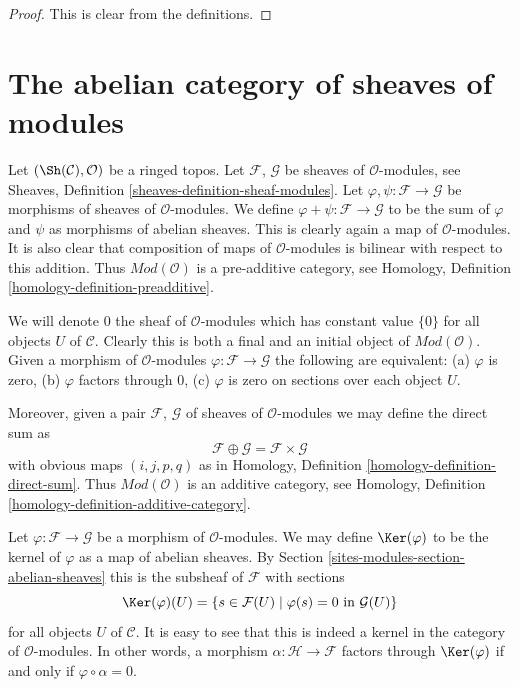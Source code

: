 \begin{proof}
This is clear from the definitions.
\end{proof}

\section{The abelian category of sheaves of modules}
\label{sites-modules-section-kernels}
Let $(\Sh(\mathcal{C}), \mathcal{O})$ be a ringed topos.
Let $\mathcal{F}$, $\mathcal{G}$ be sheaves of $\mathcal{O}$-modules, see
Sheaves, Definition \ref{sheaves-definition-sheaf-modules}.
Let $\varphi, \psi : \mathcal{F} \to \mathcal{G}$
be morphisms of sheaves of $\mathcal{O}$-modules.
We define $\varphi + \psi : \mathcal{F} \to \mathcal{G}$
to be the sum of $\varphi$ and $\psi$ as morphisms of abelian sheaves.
This is clearly again a map of $\mathcal{O}$-modules.
It is also clear that composition of maps of
$\mathcal{O}$-modules is bilinear with respect to this
addition. Thus $\textit{Mod}(\mathcal{O})$ is a pre-additive
category, see Homology, Definition \ref{homology-definition-preadditive}.

\medskip\noindent
We will denote $0$ the sheaf of $\mathcal{O}$-modules
which has constant value $\{0\}$ for all objects $U$ of $\mathcal{C}$.
Clearly this is both a final and an initial object of
$\textit{Mod}(\mathcal{O})$. Given a morphism
of $\mathcal{O}$-modules $\varphi : \mathcal{F} \to \mathcal{G}$
the following are equivalent:
(a) $\varphi$ is zero, (b) $\varphi$ factors through $0$,
(c) $\varphi$ is zero on sections over each object $U$.

\medskip\noindent
Moreover, given a pair
$\mathcal{F}$, $\mathcal{G}$ of sheaves of $\mathcal{O}$-modules
we may define the direct sum as
$$
\mathcal{F} \oplus \mathcal{G} = \mathcal{F} \times \mathcal{G}
$$
with obvious maps $(i, j, p, q)$ as in Homology, Definition
\ref{homology-definition-direct-sum}. Thus $\textit{Mod}(\mathcal{O})$
is an additive category, see
Homology, Definition \ref{homology-definition-additive-category}.

\medskip\noindent
Let $\varphi : \mathcal{F} \to \mathcal{G}$ be a morphism
of $\mathcal{O}$-modules. We may define $\Ker(\varphi)$
to be the kernel of $\varphi$ as a map of abelian sheaves.
By Section \ref{sites-modules-section-abelian-sheaves} this is the
subsheaf of $\mathcal{F}$ with sections
$$
\Ker(\varphi)(U) =
\{ s \in \mathcal{F}(U) \mid \varphi(s) = 0 \text{ in } \mathcal{G}(U)\}
$$
for all objects $U$ of $\mathcal{C}$. It is easy to see that this is indeed
a kernel in the category of $\mathcal{O}$-modules. In other words,
a morphism $\alpha : \mathcal{H} \to \mathcal{F}$ factors
through $\Ker(\varphi)$ if and only if $\varphi \circ \alpha = 0$.

